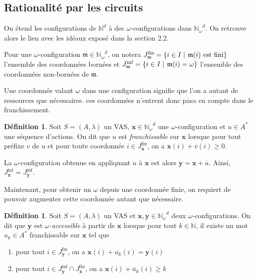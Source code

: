 \documentclass[a4paper,final]{article}
\theoremstyle{definition}
\newtheorem{Definition}[Theorem]{Définition}
\let\geq\geqslant
\newcommand{\set}[2]{\left\{#1\mathrel{\left|\vphantom{#1}\vphantom{#2}\right.}#2\right\}}
\newcommand{\os}[1]{\left\{\mathinner{#1}\right\}}
\let\inter\cap
\newcommand{\N}{\ensuremath{\mathbb{N}}}
\newcommand{\Nomega}{\ensuremath{\mathbb{N}_\omega}}
\newcommand{\lang}{\ensuremath{\mathcal{L}}}
\newcommand{\vect}[1]{\ensuremath{\mathbf{#1}}}
\newcommand{\valeur}[1]{\ensuremath{\overline{#1}}}
\newcommand{\Jfin}[1]{J^\text{fin}_{#1}}
\newcommand{\Jinf}[1]{J^\text{inf}_{#1}}
\begin{document}
\subsection{Rationalité par les circuits}



On étend les configurations de $\N^d$ à des $\omega$-configurations dans $\Nomega^d$.
On retrouve alors le lien avec les idéaux exposé dans la section 2.2.

Pour une $\omega$-configuration $\mathfrak{m} \in \Nomega^d$, on notera $\Jfin{\mathfrak{m}} = \set{i\in I}{\mathfrak{m}(i) \text{ est fini}}$ l'ensemble des coordonnées bornées et  $\Jinf{\mathfrak{m}} = \set{i\in I}{\mathfrak{m}(i)=\omega}$ l'ensemble des coordonnées non-bornées de $\mathfrak{m}$.

Une coordonnée valant $\omega$ dans une configuration signifie que l'on a autant de ressources que nécessaires.
ces coordonnées n'entrent donc pasa en compte dans le franchissement.

\begin{Definition}
Soit $S = (A,\lambda)$ un VAS, $\vect{x} \in \Nomega^d$ une $\omega$-configuration et $u \in A^*$ une séquence d'actions.
On dit que $u$ est \emph{franchissable} sur $\vect{x}$ lorsque pour tout préfixe $v$ de $u$ et pour toute coordonnée $i \in \Jfin{\vect{x}}$, on a $\vect{x}(i) + \valeur{v}(i) \geq 0$.

La $\omega$-configuration obtenue en appliquant $u$ à $\vect{x}$ est alors $\vect{y} = \vect{x} + \valeur{u}$.
Ainsi, $\Jinf{\vect{x}} = \Jinf{\vect{y}}$.
\end{Definition}

Maintenant, pour obtenir un $\omega$ depuis une coordonnée finie, on requiert de pouvoir augmenter cette coordonnée autant que nécessaire. 

\begin{Definition}
Soit $S = (A,\lambda)$ un VAS et $\vect{x},\vect{y} \in \Nomega^d$ deux $\omega$-configurations.
On dit que $\vect{y}$ est \emph{$\omega$-accessible} à partir de $\vect{x}$ lorsque pour tout $k\in\N$, il existe un mot $u_k \in A^*$ franchissable sur $\vect{x}$ tel que 
\begin{enumerate}
    \item pour tout $i\in\Jfin{\vect{y}}$, on a $\vect{x}(i) + \valeur{u_k}(i) = \vect{y}(i)$
    \item pour tout $i\in \Jinf{\vect{y}} \inter \Jfin{\vect{x}}$, on a $\vect{x}(i) + \valeur{u_k}(i) \geq k$
\end{enumerate}
\end{Definition}
\end{document}
